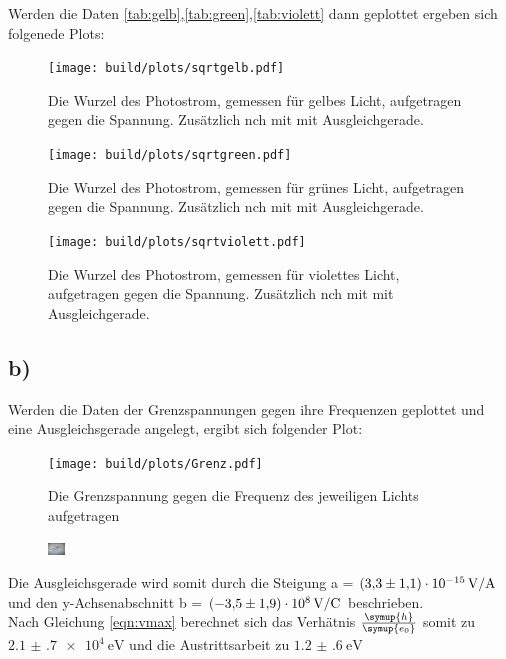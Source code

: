     \noindent
    Werden die Daten \ref{tab:gelb},\ref{tab:green},\ref{tab:violett} dann geplottet ergeben sich folgenede Plots:
    \noindent

    \begin{figure}[H]
        \centering
        \texttt{[image: build/plots/sqrtgelb.pdf]}
        \caption{Die Wurzel des Photostrom, gemessen für gelbes Licht, aufgetragen gegen die Spannung. Zusätzlich nch mit mit Ausgleichgerade.}
        \label{img:sqrtgelb}
    \end{figure}

    \begin{figure}[H]
        \centering
        \texttt{[image: build/plots/sqrtgreen.pdf]}
        \caption{Die Wurzel des Photostrom, gemessen für grünes Licht, aufgetragen gegen die Spannung. Zusätzlich nch mit mit Ausgleichgerade.}
        \label{img:sqrtgruen}
    \end{figure}

    \begin{figure}[H]
        \centering
        \texttt{[image: build/plots/sqrtviolett.pdf]}
        \caption{Die Wurzel des Photostrom, gemessen für violettes Licht, aufgetragen gegen die Spannung. Zusätzlich nch mit mit Ausgleichgerade.}
        \label{img:sqrtviolett}
    \end{figure}
\newpage
\subsection{b)}

    \noindent
    Werden die Daten der Grenzspannungen gegen ihre Frequenzen geplottet und eine Ausgleichsgerade angelegt, ergibt sich folgender Plot:
    \noindent

    \begin{figure}[H]
        \centering
        \texttt{[image: build/plots/Grenz.pdf]}
        \caption{Die Grenzspannung gegen die Frequenz des jeweiligen Lichts aufgetragen}
        \label{img:gegen}
    \end{figure}

    \begin{figure}[H]
        \centering
        \includegraphics[width=0.04\textwidth]{latex/images/meme.PNG}
    \end{figure}

    \noindent
    Die Ausgleichsgerade wird somit durch die Steigung a = $\SI{3.3 (11)e-15}{\volt\per\ampere}$ und den y-Achsenabschnitt 
    b = $\SI{-3.5 (19)e8}{\volt\per\coulomb}$ beschrieben.\\
    Nach Gleichung \ref{eqn:vmax} berechnet sich das Verhätnis $\frac{\symup{h}}{\symup{e_0}}$ somit zu $\SI{2.1(7)e4}{\electronvolt}$ und die 
    Austrittsarbeit zu $\SI{1.2(6)}{\electronvolt}$
    \noindent

